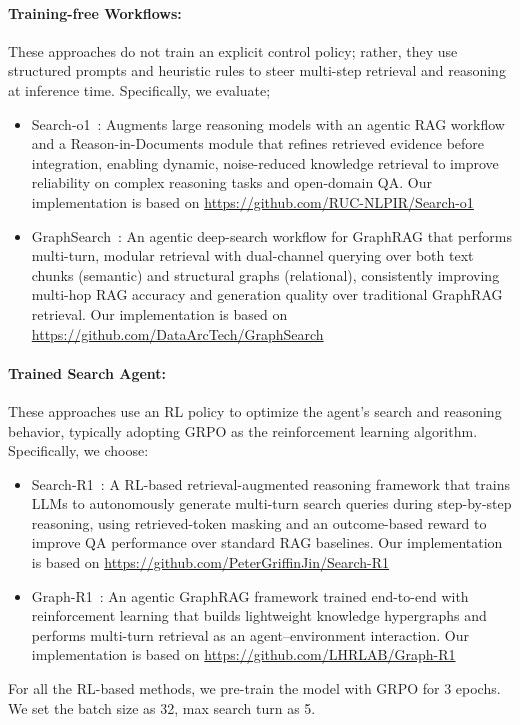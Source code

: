 \paragraph{\textbf{Training-free Workflows:}}
These approaches do not train an explicit control policy; rather, they use structured prompts and heuristic rules to steer multi-step retrieval and reasoning at inference time. Specifically, we evaluate;
\begin{itemize}
    \item Search-o1~\cite{li2025searcho1}: Augments large reasoning models with an agentic RAG workflow and a Reason-in-Documents module that refines retrieved evidence before integration, enabling dynamic, noise-reduced knowledge retrieval to improve reliability on complex reasoning tasks and open-domain QA. Our implementation is based on \url{https://github.com/RUC-NLPIR/Search-o1}
    \item GraphSearch~\cite{yang2025graphsearch}: An agentic deep-search workflow for GraphRAG that performs multi-turn, modular retrieval with dual-channel querying over both text chunks (semantic) and structural graphs (relational), consistently improving multi-hop RAG accuracy and generation quality over traditional GraphRAG retrieval. Our implementation is based on \url{https://github.com/DataArcTech/GraphSearch}
\end{itemize}
\paragraph{\textbf{Trained Search Agent:}}
These approaches use an RL policy to optimize the agent’s search and reasoning behavior, typically adopting GRPO as the reinforcement learning algorithm. Specifically, we choose:
\begin{itemize}
    \item Search-R1~\cite{jin2025searchr1}: A RL-based retrieval-augmented reasoning framework that trains LLMs to autonomously generate multi-turn search queries during step-by-step reasoning, using retrieved-token masking and an outcome-based reward to improve QA performance over standard RAG baselines. Our implementation is based on \url{https://github.com/PeterGriffinJin/Search-R1}
    \item Graph-R1~\cite{luo2025graphr1}: An agentic GraphRAG framework trained end-to-end with reinforcement learning that builds lightweight knowledge hypergraphs and performs multi-turn retrieval as an agent–environment interaction. Our implementation is based on \url{https://github.com/LHRLAB/Graph-R1}
\end{itemize}
For all the RL-based methods, we pre-train the model with GRPO for 3 epochs. We set the batch size as 32, max search turn as 5.

